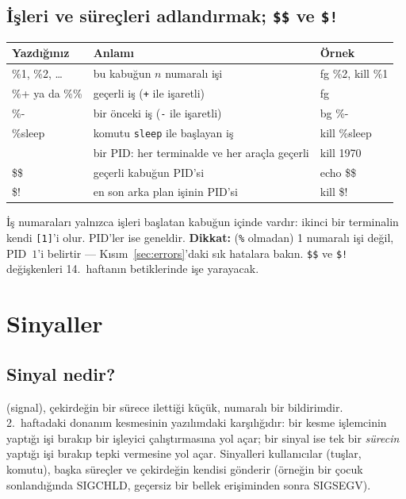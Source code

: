 \subsection{İşleri ve süreçleri adlandırmak; \texttt{\$\$} ve \texttt{\$!}}

\begin{center}
\renewcommand{\arraystretch}{1.2}
\begin{tabularx}{\linewidth}{>{\ttfamily}l >{\raggedright\arraybackslash}X >{\ttfamily}l}
\toprule
\textbf{\rmfamily Yazdığınız} & \textbf{Anlamı} & \textbf{\rmfamily Örnek}\\
\midrule
\%1, \%2, \dots & bu kabuğun $n$ numaralı işi & fg \%2, kill \%1\\
\%+ \textrm{ya da} \%\% & geçerli iş (\texttt{+} ile işaretli) & fg\\
\%- & bir önceki iş (\texttt{-} ile işaretli) & bg \%-\\
\%sleep & komutu \texttt{sleep} ile başlayan iş & kill \%sleep\\
1970 & bir PID: her terminalde ve her araçla geçerli & kill 1970\\
\$\$ & geçerli kabuğun PID'si & echo \$\$\\
\$! & en son arka plan işinin PID'si & kill \$!\\
\bottomrule
\end{tabularx}
\end{center}

İş numaraları yalnızca işleri başlatan kabuğun içinde vardır: ikinci bir terminalin kendi \texttt{[1]}'i olur. PID'ler ise geneldir. \textbf{Dikkat:}  (\texttt{\%} olmadan) 1 numaralı işi değil, PID~$1$'i belirtir --- Kısım~\ref{sec:errors}'daki sık hatalara bakın. \verb|$$| ve \verb|$!| değişkenleri 14.~haftanın betiklerinde işe yarayacak.

\section{Sinyaller}
\label{sec:signals}

\subsection{Sinyal nedir?}

 (signal), çekirdeğin bir sürece ilettiği küçük, numaralı bir bildirimdir. 2.~haftadaki donanım kesmesinin yazılımdaki karşılığıdır: bir kesme işlemcinin yaptığı işi bırakıp bir işleyici çalıştırmasına yol açar; bir sinyal ise tek bir \emph{sürecin} yaptığı işi bırakıp tepki vermesine yol açar. Sinyalleri kullanıcılar (tuşlar,  komutu), başka süreçler ve çekirdeğin kendisi gönderir (örneğin bir çocuk sonlandığında SIGCHLD, geçersiz bir bellek erişiminden sonra SIGSEGV).

